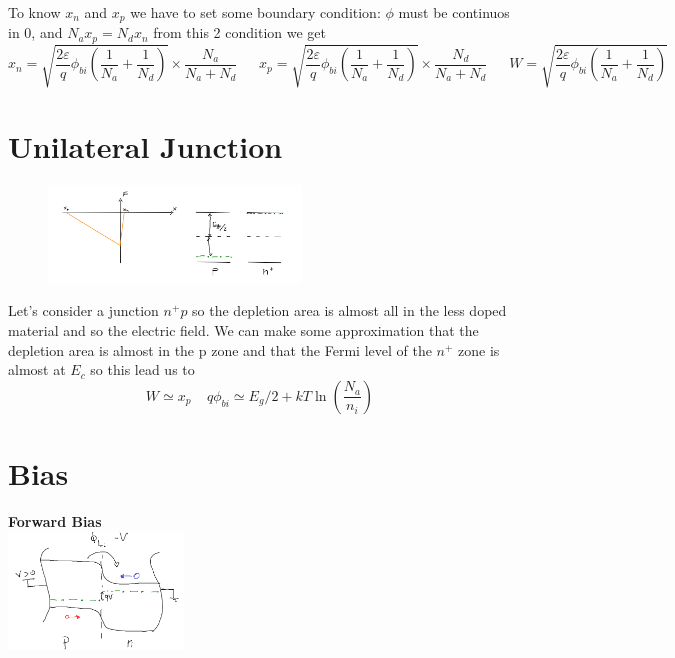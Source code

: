 To know $x_n$ and $x_p$ we have to set some boundary condition: $\phi$ must be continuos in 0, and $N_ax_p=N_dx_n$ from this 2 condition we get 
\begin{equation}
x_n=\sqrt{\frac{2\varepsilon}{q}\phi_{bi}(\frac{1}{N_a}+\frac{1}{N_d})}\times \frac{N_a}{N_a+N_d}\ \ \ \ \ \ \ 
x_p=\sqrt{\frac{2\varepsilon}{q}\phi_{bi}(\frac{1}{N_a}+\frac{1}{N_d})}\times \frac{N_d}{N_a+N_d}\ \ \ \ \ \ \ 
W=\sqrt{\frac{2\varepsilon}{q}\phi_{bi}(\frac{1}{N_a}+\frac{1}{N_d})}
\end{equation}

\section{Unilateral Junction}

\begin{figure}
\includegraphics[width=0.6\textwidth]{pn6.png}
\end{figure}

Let's consider a junction $n^+p$ so the depletion area is almost all in the less doped material and so the electric field. We can make some approximation that the depletion area is almost in the p zone and that the Fermi level of the $n^+$ zone is almost at $E_c$ so this lead us to 
\begin{equation}
W\simeq x_p \ \ \ \ \ q\phi_{bi}\simeq E_g/2 + kT\ln(\frac{N_a}{n_i})
\end{equation}

\section{Bias}
{\bf Forward Bias}\\

\centering
\includegraphics[width=0.35\textwidth]{pn7.png}\\
\raggedright

